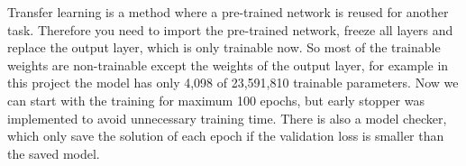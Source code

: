 \documentclass[../ImageClassifier.tex]{subfiles}
\begin{document}
    Transfer learning is a method where a pre-trained network is reused for another task.
    Therefore you need to import the pre-trained network, freeze all layers and replace the output layer, which is only trainable now. 
    So most of the trainable weights are non-trainable except the weights of the output layer, for example in this project the model has only 4,098 of 23,591,810 trainable parameters.
    Now we can start with the training for maximum 100 epochs, but early stopper was implemented to avoid unnecessary training time.
    There is also a model checker, which only save the solution of each epoch if the validation loss is smaller than the saved model.
\end{document}
